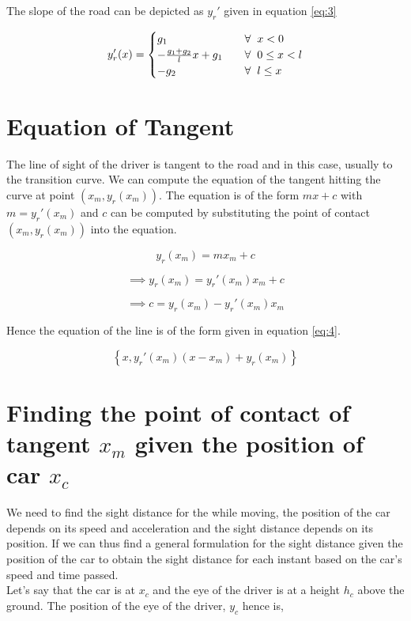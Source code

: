 \documentclass{article}
\begin{document}
    The slope of the road can be depicted as $y_{r}'$ given in equation \ref{eq:3}
    
    \begin{equation} \label{eq:3}
        y_{r}'(x) = 
            \begin{cases}
                g_{1} &\quad\forall \hspace{0.2cm} x < 0\\
                -\frac{g_{1} + g_{2}}{l}x + g_{1} &\quad\forall \hspace{0.2cm} 0 \leq x < l\\
                -g_{2} &\quad\forall \hspace{0.2cm} l \leq x\\
            \end{cases}    
    \end{equation}
    
\section{Equation of Tangent}
    The line of sight of the driver is tangent to the road and in this case, usually to the transition curve. We can compute the equation of the tangent hitting the curve at point $(x_{m}, y_{r}(x_{m}))$. The equation is of the form $mx + c$ with $m = y_{r}'(x_{m})$ and $c$ can be computed by substituting the point of contact $(x_{m}, y_{r}(x_{m}))$ into the equation.
    
    \begin{equation*}
        y_{r}(x_{m}) = mx_{m} + c
    \end{equation*}
    
    \begin{equation*}
        \implies y_{r}(x_{m}) = y_{r}'(x_{m})x_{m} + c
    \end{equation*}
    
    \begin{equation*}
        \implies c = y_{r}(x_{m}) - y_{r}'(x_{m})x_{m}
    \end{equation*}
    
    Hence the equation of the line is of the form given in equation \ref{eq:4}.
    
    \begin{equation} \label{eq:4}
        \left \{ x, y_{r}'(x_{m})(x - x_{m}) + y_{r}(x_{m}) \right \}
    \end{equation}
    
\section{Finding the point of contact of tangent $x_{m}$ given the position of car $x_{c}$}
    We need to find the sight distance for the while moving, the position of the car depends on its speed and acceleration and the sight distance depends on its position. If we can thus find a general formulation for the sight distance given the position of the car to obtain the sight distance for each instant based on the car's speed and time passed.\\
    Let's say that the car is at $x_{c}$ and the eye of the driver is at a height $h_{c}$ above the ground. The position of the eye of the driver, $y_{c}$ hence is,
    
\end{document}
